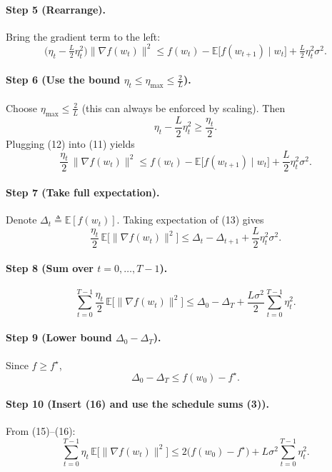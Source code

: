 \documentclass{article}
\newcommand{\E}{\mathbb{E}}
\begin{document}
\paragraph{Step 5 (Rearrange).}
Bring the gradient term to the left:
\[
\bigl(\eta_t-\tfrac{L}{2}\eta_t^{2}\bigr)\|\nabla f(w_t)\|^{2}
\le f(w_t)-\E\!\bigl[f(w_{t+1})\mid w_t\bigr]
      +\tfrac{L}{2}\eta_t^{2}\sigma^{2}.
\tag{11}
\]

\paragraph{Step 6 (Use the bound $\eta_t\le\eta_{\max}\le\frac{2}{L}$).}
Choose $\eta_{\max}\le\frac{2}{L}$ (this can always be enforced by scaling). Then
\[
\eta_t-\frac{L}{2}\eta_t^{2}\ge\frac{\eta_t}{2}.
\tag{12}
\]
Plugging (12) into (11) yields
\[
\frac{\eta_t}{2}\,\|\nabla f(w_t)\|^{2}
\le f(w_t)-\E\!\bigl[f(w_{t+1})\mid w_t\bigr]
      +\frac{L}{2}\eta_t^{2}\sigma^{2}.
\tag{13}
\]

\paragraph{Step 7 (Take full expectation).}
Denote $\Delta_t\triangleq\E[f(w_t)]$. Taking expectation of (13) gives
\[
\frac{\eta_t}{2}\,\E\!\bigl[\|\nabla f(w_t)\|^{2}\bigr]
\le \Delta_t-\Delta_{t+1}
      +\frac{L}{2}\eta_t^{2}\sigma^{2}.
\tag{14}
\]

\paragraph{Step 8 (Sum over $t=0,\dots,T-1$).}
\[
\sum_{t=0}^{T-1}\frac{\eta_t}{2}\,\E\!\bigl[\|\nabla f(w_t)\|^{2}\bigr]
\le \Delta_0-\Delta_T
      +\frac{L\sigma^{2}}{2}\sum_{t=0}^{T-1}\eta_t^{2}.
\tag{15}
\]

\paragraph{Step 9 (Lower bound $\Delta_0-\Delta_T$).}
Since $f\ge f^{\star}$,
\[
\Delta_0-\Delta_T\le f(w_0)-f^{\star}.
\tag{16}
\]

\paragraph{Step 10 (Insert (16) and use the schedule sums (3)).}
From (15)–(16):
\[
\sum_{t=0}^{T-1}\eta_t\,\E\!\bigl[\|\nabla f(w_t)\|^{2}\bigr]
\le 2\bigl(f(w_0)-f^{\star}\bigr)
     +L\sigma^{2}\sum_{t=0}^{T-1}\eta_t^{2}.
\tag{17}
\]
\end{document}
